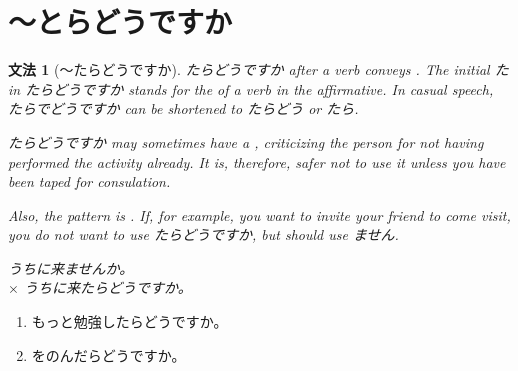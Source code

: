 \documentclass[notoc,notitlepage]{tufte-book}
\newtheorem{grammar}{\faBook \enspace 文法}[section]
\begin{document}

\section{〜とらどうですか}%
\label{sec:_toradoudesuka}

\begin{grammar}[〜たらどうですか]
\label{grammar:_taradoudesuka}
  たらどうですか after a verb conveys . The initial た in たらどうですか stands for the  of a verb in the affirmative. In casual speech, たらでどうですか can be shortened to たらどう or たら.

  たらどうですか may sometimes have a , criticizing the person for not having performed the activity already. It is, therefore, safer not to use it unless you have been taped for consulation.

  Also, the pattern is . If, for example, you want to invite your friend to come visit, you do not want to use たらどうですか, but should use ません.
  \begin{center}
    うちに来ませんか。\\
    $\times$ うちに来たらどうですか。
  \end{center}
\end{grammar}

\begin{eg}
  \begin{enumerate}
    \item もっと勉強したらどうですか。
    \item {}をのんだらどうですか。
  \end{enumerate}
\end{eg}
\end{document}
